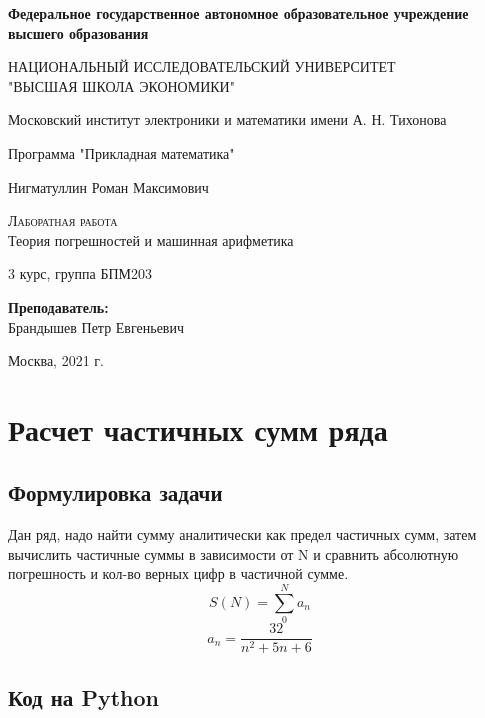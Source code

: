 \documentclass[a4paper,12pt]{article}
\begin{document}
\begin{titlepage}
  \begin{center}
    \large
     
    \textbf{Федеральное государственное автономное образовательное учреждение высшего образования}
    \vspace{0.5cm}
 
    НАЦИОНАЛЬНЫЙ ИССЛЕДОВАТЕЛЬСКИЙ УНИВЕРСИТЕТ \\ "ВЫСШАЯ ШКОЛА ЭКОНОМИКИ"
    \vspace{0.5cm}
     
    Московский институт электроники и математики имени А. Н. Тихонова 
     
    Программа "Прикладная математика"
    \vfill
     
     
    Нигматуллин Роман Максимович
    \vfill
 
    \textsc{Лаборатная работа}\\[5mm]
     
    {\LARGE Теория погрешностей и машинная арифметика\\[2mm]
    }
  \bigskip
     
    3 курс, группа БПМ203
\end{center}
\vfill
 

 
\hfill\begin{flushright}
  \textbf{Преподаватель:}\\
  Брандышев Петр Евгеньевич
\end{flushright}%
\vfill
 
\begin{center}
  Москва, 2021 г.
\end{center}
\end{titlepage}


\tableofcontents

\section{Расчет частичных сумм ряда}
\subsection{Формулировка задачи}
Дан ряд, надо найти сумму аналитически как предел частичных сумм, затем вычислить частичные суммы в зависимости от N и сравнить абсолютную погрешность и кол-во верных цифр в частичной сумме.
   $$S(N) = \sum_0^N a_n$$
   $$a_n = \frac{32}{n^2 +5n +6}$$

\subsection{Код на Python}
\end{document}
